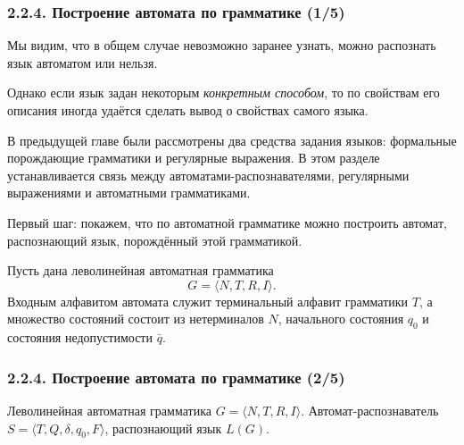 \documentclass[mathserif,12pt,aspectratio=169]{beamer}
\def\Assign{\operatorname{:=}}
\begin{document}
\begin{frame}
\frametitle{2.2.4. Построение автомата по грамматике (1/5)}

Мы видим, что в общем случае невозможно заранее узнать,
можно распознать язык автоматом или нельзя.

\smallskip
Однако если язык задан некоторым \emph{конкретным способом},
то по свойствам его описания иногда удаётся сделать вывод
о свойствах самого языка.

\smallskip
В предыдущей главе были рассмотрены два средства задания языков:
формальные порождающие грамматики и регулярные выражения.
В этом разделе устанавливается связь между
автоматами-распознавателями,
регулярными выражениями и
автоматными грамматиками.

\smallskip
Первый шаг: покажем, что по автоматной грамматике можно построить
автомат, распознающий язык, порождённый этой грамматикой.

\smallskip
Пусть дана леволинейная автоматная грамматика
\[
G=\langle N,T,R,I\rangle.
\]
Входным алфавитом автомата служит терминальный алфавит грамматики \(T\),
а множество состояний состоит из нетерминалов \(N\),
начального состояния \(q_0\) и состояния недопустимости \(\bar q\).

\end{frame}

\begin{frame}
\frametitle{2.2.4. Построение автомата по грамматике (2/5)}

\vspace{-4pt}
{\linespread{0.92}\selectfont
\begin{algorithmic}
\REQUIRE Леволинейная автоматная грамматика \(G=\langle N,T,R,I\rangle\).
\ENSURE Автомат-распознаватель
\(S=\langle T,Q,\delta,q_0,F\rangle\), распознающий язык \(L(G)\).

\STATE{\textbf{\(Q \Assign N\cup\{q_0,\bar q\}\)}}

    \STATE{\textbf{\(\delta(q_0,a)\Assign \delta(q_0,a)\cup\{A\}\)}}
  \ELSE
    \STATE{\textbf{\(\delta(B,a)\Assign \delta(B,a)\cup\{A\}\)}}
  \ENDIF
\ENDFOR

    \STATE{\textbf{\(\delta(q,a)\Assign \{\bar q\}\)}}
  \ENDIF
\ENDFOR

\STATE{\textbf{\(F\Assign\{I\}\)}}
\end{algorithmic}
}

\end{frame}
\end{document}
